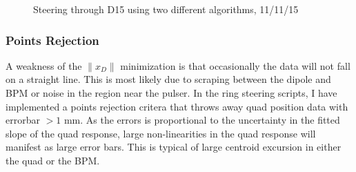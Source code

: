 \begin{figure}[htb]
\centering
{}
\hspace{.05in}
\hspace{.25in}
\raggedleft
{}

\caption{Steering through D15 using two different algorithms, 11/11/15}
\label{fig:injection_steering}
\end{figure}


\subsubsection{Points Rejection}
A weakness of the  $\| x_D \|$ minimization is that occasionally the data will not fall on a straight line. This is most likely due to scraping between the dipole and BPM or noise in the region near the pulser. In the ring steering scripts, I have implemented a points rejection critera that throws away quad position data with errorbar $> 1$ mm. As the errors is proportional to the uncertainty in the fitted slope of the quad response, large non-linearities in the quad response will manifest as large error bars. This is typical of large centroid excursion in either the quad or the BPM.

